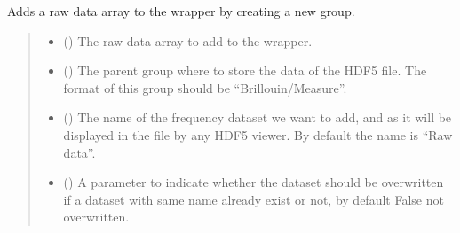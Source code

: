 \documentclass[letterpaper,10pt,english]{sphinxmanual}
\begin{document}
\begin{fulllineitems}
\begin{fulllineitems}
\end{fulllineitems}


\begin{fulllineitems}
\label{\detokenize{_autosummary/HDF5_BLS.wrapper:HDF5_BLS.wrapper.Wrapper.add_raw_data}}
\pysigstartsignatures
\pysiglinewithargsret
{}
{\sphinxparamcomma {}\sphinxparamcomma {}\sphinxparamcomma {}}
{}
\pysigstopsignatures
\sphinxAtStartPar
Adds a raw data array to the wrapper by creating a new group.
\begin{quote}\begin{description}
\begin{itemize}
\item {} 
\sphinxAtStartPar
{} () \textendash{} The raw data array to add to the wrapper.

\item {} 
\sphinxAtStartPar
{} (\sphinxstyleliteralemphasis{\sphinxupquote{, }}) \textendash{} The parent group where to store the data of the HDF5 file. The format of this group should be “Brillouin/Measure”.

\item {} 
\sphinxAtStartPar
{} (\sphinxstyleliteralemphasis{\sphinxupquote{, }}) \textendash{} The name of the frequency dataset we want to add, and as it will be displayed in the file by any HDF5 viewer. By default the name is “Raw data”.

\item {} 
\sphinxAtStartPar
{} (\sphinxstyleliteralemphasis{\sphinxupquote{, }}) \textendash{} A parameter to indicate whether the dataset should be overwritten if a dataset with same name already exist or not, by default False \sphinxhyphen{} not overwritten.


\end{itemize}
\end{description}
\end{quote}
\end{fulllineitems}
\end{fulllineitems}
\end{document}
